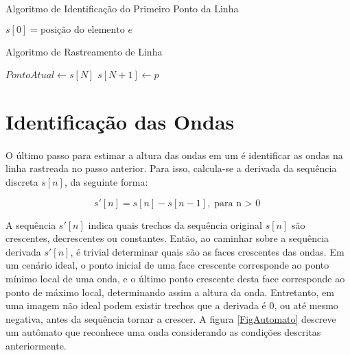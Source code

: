 \begin{algorithm}
  \caption{Algoritmo de Identificação do Primeiro Ponto da Linha}
  \label{AlgFirstPoint}
\begin{algorithmic}
                        \State $s[0] = \text{posição do elemento } e$
                \EndIf
        \EndFor
\EndFor
\EndProcedure
\end{algorithmic}
\end{algorithm}

\begin{algorithm}
  \caption{Algoritmo de Rastreamento de Linha}
  \label{AlgLineTracking}
\begin{algorithmic}
\State $PontoAtual \gets s[N]$ 
                \State $s[N+1] \gets p$
        \EndIf
\EndFor
{}
\Else
        \Else
        \EndIf
\EndIf
\EndProcedure
\end{algorithmic}
\end{algorithm}

\section{Identificação das Ondas}

\paragraph{}O último passo para estimar a altura das ondas em um \timestack é identificar as ondas na linha rastreada no passo anterior. Para isso, calcula-se a derivada da sequência discreta $s[n]$, da seguinte forma:

\[
  s'[n] = s[n] - s[n-1], \text{para n $>$ 0}
\] 

\noindent{}A sequência $s'[n]$ indica quais trechos da sequência original $s[n]$ são crescentes, decrescentes ou constantes. Então, ao caminhar sobre a sequência derivada $s'[n]$, é trivial determinar quais são as faces crescentes das ondas. Em um cenário ideal, o ponto inicial de uma face crescente corresponde ao ponto mínimo local de uma onda, e o último ponto crescente desta face corresponde ao ponto de máximo local, determinando assim a altura da onda. Entretanto, em uma imagem não ideal podem existir trechos que a derivada é $0$, ou até mesmo negativa, antes da sequência tornar a crescer. A figura \ref{FigAutomato} descreve um autômato que reconhece uma onda considerando as condições descritas anteriormente.

